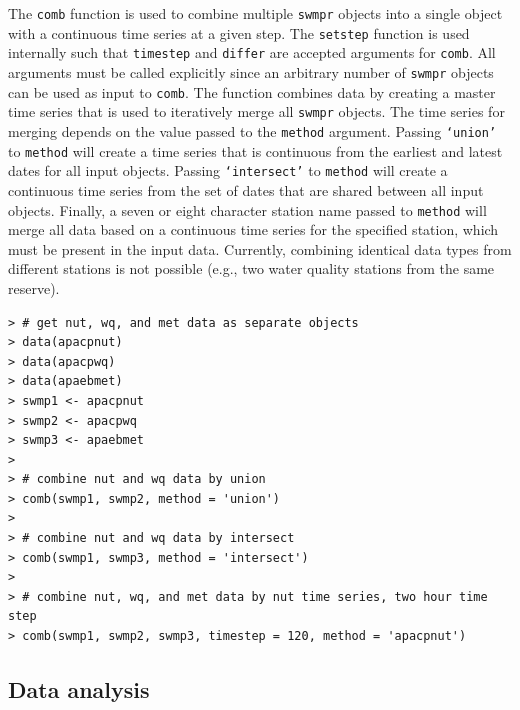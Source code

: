 \documentclass[10pt,letterpaper]{article}\usepackage[]{graphicx}\usepackage[]{color}
\makeatletter
\newenvironment{kframe}{%
 \def\at@end@of@kframe{}%
 \ifinner\ifhmode%
  \def\at@end@of@kframe{\end{minipage}}%
  \begin{minipage}{\columnwidth}%
 \fi\fi%
 \def\FrameCommand##1{\hskip\@totalleftmargin \hskip-\fboxsep
 \colorbox{shadecolor}{##1}\hskip-\fboxsep
     \hskip-\linewidth \hskip-\@totalleftmargin \hskip\columnwidth}%
 \MakeFramed {\advance\hsize-\width
   \@totalleftmargin\z@ \linewidth\hsize
   \@setminipage}}%
 {\par\unskip\endMakeFramed%
 \at@end@of@kframe}
\newenvironment{knitrout}{}{} %
\makeatother
\begin{document}
The \texttt{comb} function is used to combine multiple \texttt{swmpr} objects into a single object with a continuous time series at a given step.  The \texttt{setstep} function is used internally such that \texttt{timestep} and \texttt{differ} are accepted arguments for \texttt{comb}.  All arguments must be called explicitly since an arbitrary number of \texttt{swmpr} objects can be used as input to \texttt{comb}.  The function combines data by creating a master time series that is used to iteratively merge all \texttt{swmpr} objects.  The time series for merging depends on the value passed to the \texttt{method} argument.  Passing \texttt{`union'} to \texttt{method} will create a time series that is continuous from the earliest and latest dates for all input objects.  Passing \texttt{`intersect'} to \texttt{method} will create a continuous time series from the set of dates that are shared between all input objects.  Finally, a seven or eight character station name passed to \texttt{method} will merge all data based on a continuous time series for the specified station, which must be present in the input data.  Currently, combining identical data types from different stations is not possible (e.g., two water quality stations from the same reserve).  

\begin{knitrout}\small
{}\color{fgcolor}\begin{kframe}
\begin{verbatim}
> # get nut, wq, and met data as separate objects
> data(apacpnut)
> data(apacpwq)
> data(apaebmet)
> swmp1 <- apacpnut
> swmp2 <- apacpwq
> swmp3 <- apaebmet
> 
> # combine nut and wq data by union
> comb(swmp1, swmp2, method = 'union')
> 
> # combine nut and wq data by intersect
> comb(swmp1, swmp3, method = 'intersect')
> 
> # combine nut, wq, and met data by nut time series, two hour time step
> comb(swmp1, swmp2, swmp3, timestep = 120, method = 'apacpnut')
\end{verbatim}
\end{kframe}
\end{knitrout}

\subsection*{Data analysis}
\end{document}
